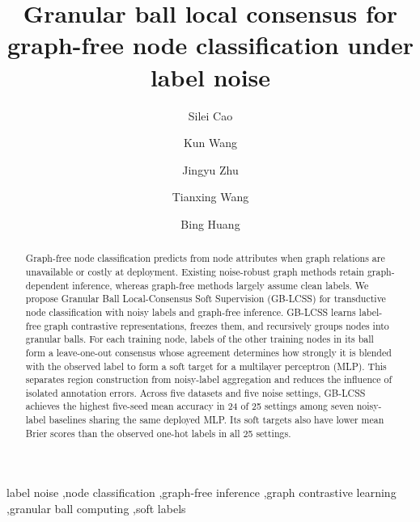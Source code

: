 \documentclass[times,review,10pt]{elsarticle}
\theoremstyle{definition}
\theoremstyle{plain}
\begin{document}
\begin{frontmatter}

\title{Granular ball local consensus for graph-free node classification under label noise}

\author[inst1]{{\footnotesize Silei Cao}}
\author[inst1]{{\footnotesize Kun Wang}}
\author[inst2]{{\footnotesize Jingyu Zhu}}
\author[inst3]{{\footnotesize Tianxing Wang}}
\author[inst1]{{\footnotesize Bing Huang}}


\begin{abstract}
\renewcommand{\baselinestretch}{1.5}\selectfont
Graph-free node classification predicts from node attributes when graph relations are unavailable or costly at deployment. Existing noise-robust graph methods retain graph-dependent inference, whereas graph-free methods largely assume clean labels. We propose Granular Ball Local-Consensus Soft Supervision (GB-LCSS) for transductive node classification with noisy labels and graph-free inference. GB-LCSS learns label-free graph contrastive representations, freezes them, and recursively groups nodes into granular balls. For each training node, labels of the other training nodes in its ball form a leave-one-out consensus whose agreement determines how strongly it is blended with the observed label to form a soft target for a multilayer perceptron (MLP). This separates region construction from noisy-label aggregation and reduces the influence of isolated annotation errors. Across five datasets and five noise settings, GB-LCSS achieves the highest five-seed mean accuracy in 24 of 25 settings among seven noisy-label baselines sharing the same deployed MLP. Its soft targets also have lower mean Brier scores than the observed one-hot labels in all 25 settings.
\end{abstract}

\begin{keyword}
label noise \sep node classification \sep graph-free inference \sep graph contrastive learning \sep granular ball computing \sep soft labels
\end{keyword}

\end{frontmatter}
\end{document}
